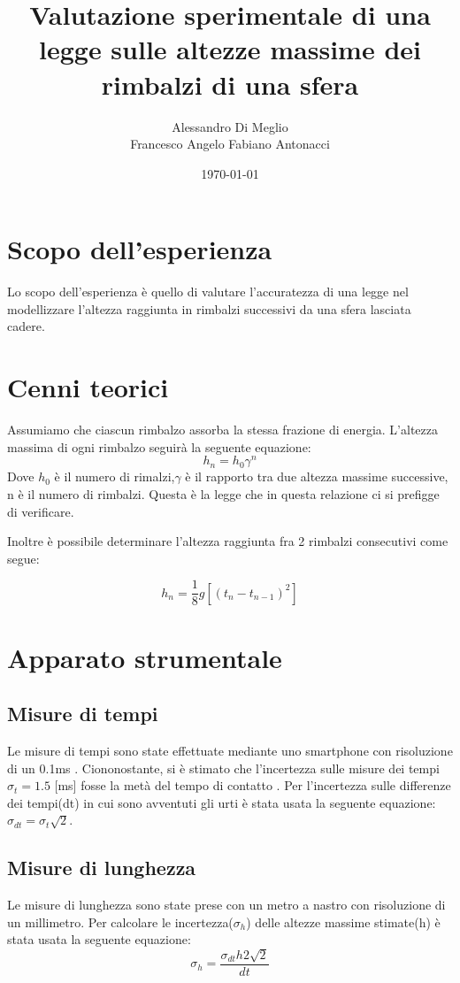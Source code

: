 \documentclass{article}
\title{Valutazione sperimentale di una legge sulle altezze massime dei rimbalzi di una sfera}
\author{Alessandro Di Meglio \\Francesco Angelo Fabiano Antonacci}
\date{\today}
\begin{document}
\maketitle

\section{Scopo dell'esperienza}
Lo scopo dell'esperienza è quello di valutare l'accuratezza di una legge nel modellizzare l'altezza raggiunta in rimbalzi successivi da una sfera lasciata cadere.


\section{Cenni teorici}
Assumiamo che ciascun rimbalzo assorba la stessa frazione di energia.
L'altezza massima di ogni rimbalzo seguirà la seguente equazione:
\begin{equation}
h_{n} = h_{0}  \gamma^{n}
\label{h(n)}
\end{equation}
Dove $h_0$ è il numero di rimalzi,$ \gamma$ è il rapporto tra due altezza massime successive, n è il numero di rimbalzi. 
Questa è la legge che in questa relazione ci si prefigge di verificare.

Inoltre è possibile determinare l'altezza raggiunta fra 2 rimbalzi consecutivi come segue:

\begin{equation}
 	h_{n} = \frac{1}{8} g[(t_{n} - t_{n-1})^2] 
		\label{h2(n)}
\end{equation}

\section{Apparato strumentale}

\subsection{Misure di tempi}
Le misure di tempi sono state effettuate mediante uno smartphone con risoluzione di un 0.1ms .
Ciononostante, si è stimato che l'incertezza sulle misure dei tempi  $\sigma_t=1.5$ [ms]  fosse la metà del tempo di contatto .
Per l'incertezza sulle differenze dei tempi(dt) in cui sono avventuti gli urti è stata usata la seguente equazione:  $\sigma_{dt}=\sigma_t\sqrt{2}$.


\subsection{Misure di lunghezza}
Le misure di lunghezza sono state prese con un metro a nastro con risoluzione di un millimetro.
Per calcolare le incertezza($\sigma_h$) delle altezze massime stimate(h) è stata usata la seguente equazione:
\begin{equation}
	\sigma_{h} = \frac{\sigma_{dt} h  2 \sqrt{2}   } {dt}
\end{equation}
\end{document}
